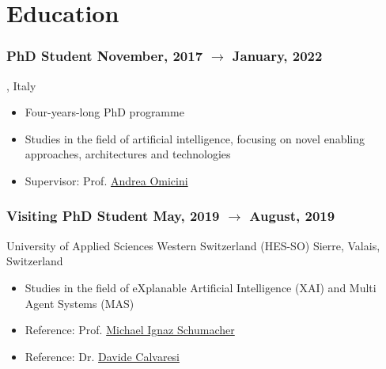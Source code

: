 
\newenvironment{activity}[4]{
    \subsubsection*{#1 \hfill #2}
    #3 \hfill #4
    \begin{itemize}[noitemsep]
    }{
    \end{itemize}
}


\section*{Education}

\begin{activity}{PhD Student}{\textbf{November, 2017 $\rightarrow$ January, 2022}}{\theprogramme}{\uniboen, Italy}
    \item Four-years-long PhD programme
	\item Studies in the field of artificial intelligence, focusing on novel enabling approaches, architectures and technologies
    \item Supervisor: Prof. \href{mailto:andrea.omicini@unibo.it}{Andrea Omicini}
\end{activity}

\begin{activity}{Visiting PhD Student}{\textbf{May, 2019 $\rightarrow$ August, 2019}}{University of Applied Sciences Western Switzerland (HES-SO)}{Sierre, Valais, Switzerland}
    \item Studies in the field of eXplanable Artificial Intelligence (XAI) and Multi Agent Systems (MAS)
    \item Reference:  Prof. \href{mailto:michael.schumacher@hevs.ch}{Michael Ignaz Schumacher}
    \item Reference:  Dr. \href{mailto:davide.calvaresi@hevs.ch}{Davide Calvaresi}
\end{activity}

